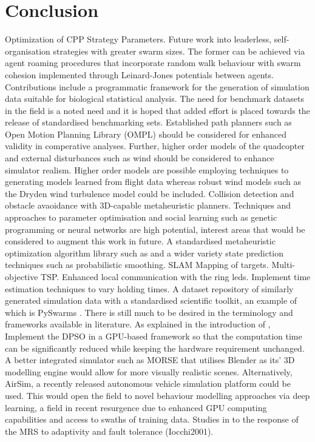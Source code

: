\documentclass{report}
\begin{document}
\chapter{Conclusion} \label{conclusion}
Optimization of CPP Strategy Parameters. Future work into leaderless, self-organisation strategies with greater swarm sizes. The former can be achieved via agent roaming procedures that incorporate random walk behaviour with swarm cohesion implemented through Leinard-Jones potentials between agents.
Contributions include a programmatic framework for the generation of simulation data suitable for biological statistical analysis. The need for benchmark datasets in the field is a noted need and it is hoped that added effort is placed towards the release of standardised benchmarking sets.
Established path planners such as Open Motion Planning Library (OMPL) \cite{Sucan2012} should be considered for enhanced validity in comperative analyses. Further, higher order models of the quadcopter and external disturbances such as wind should be considered to enhance simulator realism. Higher order models are possible employing techniques to generating models learned from flight data \cite{Symington2014} whereas robust wind models such as the Dryden wind turbulence model \cite{Dryden} could be included. Collision detection and obstacle avaoidance with 3D-capable metaheuristic planners. Techniques and approaches to parameter optimisation and social learning such as genetic programming or neural networks are high potential, interest areas that would be considered to augment this work in future.
A standardised metaheuristic optimization algorithm library such as \cite{James2018} and a wider variety state prediction techniques such as probabilistic smoothing.
SLAM Mapping of targets.
Multi-objective TSP.
Enhanced local communication with the ring leds.
Implement time estimation techniques to vary holding times.
A dataset repository of similarly generated simulation data with a standardised scientific toolkit, an example of which is PySwarms \cite{James2018}.
There is still much to be desired in the terminology and frameworks available in literature.
As explained in the introduction of \cite{Phung2017}, Implement the DPSO in a GPU-based framework so that the computation time can be significantly reduced while keeping the hardware requirement unchanged.
A better integrated simulator such as MORSE that utilises Blender as its' 3D modelling engine would allow for more visually realistic scenes. Alternatively, AirSim, a recently released autonomous vehicle simulation platform could be used. This would open the field to novel behaviour modelling approaches via deep learning, a field in recent resurgence due to enhanced GPU computing capabilities and access to swaths of training data.
Studies in to the response of the MRS to adaptivity and fault tolerance (Iocchi2001).
\end{document}
